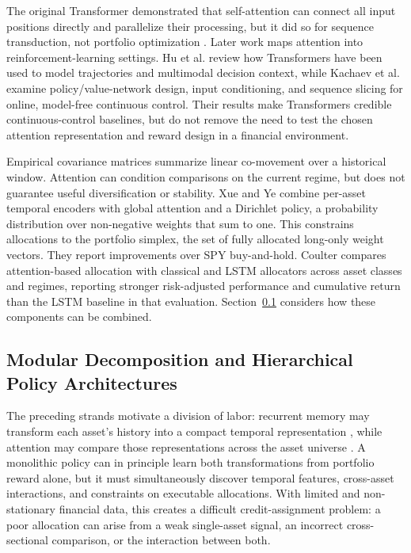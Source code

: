 The original Transformer demonstrated that self-attention can connect all input positions directly and parallelize their processing, but it did so for sequence transduction, not portfolio optimization \cite{vaswani2017}. Later work maps attention into reinforcement-learning settings. Hu et al. \cite{Hu.2024} review how Transformers have been used to model trajectories and multimodal decision context, while Kachaev et al. \cite{NikitaKachaev.2025} examine policy/value-network design, input conditioning, and sequence slicing for online, model-free continuous control. Their results make Transformers credible continuous-control baselines, but do not remove the need to test the chosen attention representation and reward design in a financial environment.

Empirical covariance matrices summarize linear co-movement over a historical window. Attention can condition comparisons on the current regime, but does not guarantee useful diversification or stability. Xue and Ye \cite{Xue.2026} combine per-asset temporal encoders with global attention and a Dirichlet policy, a probability distribution over non-negative weights that sum to one. This constrains allocations to the portfolio simplex, the set of fully allocated long-only weight vectors. They report improvements over SPY buy-and-hold. Coulter \cite{Coulter2025} compares attention-based allocation with classical and LSTM allocators across asset classes and regimes, reporting stronger risk-adjusted performance and cumulative return than the LSTM baseline in that evaluation. Section~\ref{sec:modular-composition} considers how these components can be combined.

\subsection{Modular Decomposition and Hierarchical Policy Architectures}
\label{sec:modular-composition}

The preceding strands motivate a division of labor: recurrent memory may transform each asset's history into a compact temporal representation \cite{Junfeng.2024}, while attention may compare those representations across the asset universe \cite{Coulter2025}. A monolithic policy can in principle learn both transformations from portfolio reward alone, but it must simultaneously discover temporal features, cross-asset interactions, and constraints on executable allocations. With limited and non-stationary financial data, this creates a difficult credit-assignment problem: a poor allocation can arise from a weak single-asset signal, an incorrect cross-sectional comparison, or the interaction between both.

